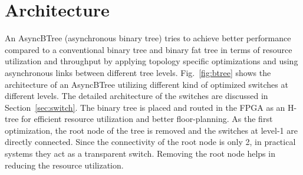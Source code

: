\section{Architecture}
\label{sec:arch}


An AsyncBTree (asynchronous binary tree) tries to achieve better performance compared to a conventional binary tree and binary fat tree in terms of resource utilization and throughput by applying topology specific optimizations and using asynchronous links between different tree levels.
Fig.~\ref{fig:btree} shows the architecture of an AsyncBTree utilizing different kind of optimized switches at different levels.
The detailed architecture of the switches are discussed in Section~\ref{sec:switch}.
The binary tree is placed and routed in the FPGA as an H-tree for efficient resource utilization and better floor-planning.
As the first optimization, the root node of the tree is removed and the switches at level-1 are directly connected.
Since the connectivity of the root node is only 2, in practical systems they act as a transparent switch.
Removing the root node helps in reducing the resource utilization.

